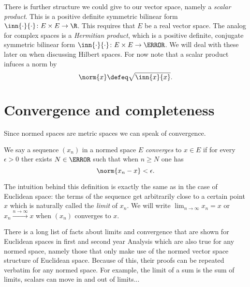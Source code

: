 \documentclass[12pt,oneside]{book}
\begin{document}
There is further structure we could give to our vector space, namely a \emph{scalar
product}. This is a positive definite symmetric bilinear form \( \inn{\cdot}{\cdot} \colon
E \times E \to \R \). This requires that \( E \) be a real vector space. The analog for
complex spaces is a \emph{Hermitian product}, which is a positive definite, conjugate
symmetric bilinear form \( \inn{\cdot}{\cdot} \colon E \times E \to \C \). We will deal
with these later on when discussing Hilbert spaces. For now note that a scalar product
infuces a norm by
\begin{equation*}
	\norm{x} \defeq \sqrt{\inn{x}{x}}.
\end{equation*}

\section{Convergence and completeness}
Since normed spaces are metric spaces we can speak of convergence. 
\begin{definition}[Convergence]
	We say a sequence \( (x_n) \) in a normed space \( E \) \emph{converges} to \( x \in E \) if
	for every \( \epsilon > 0 \) ther exists \( N \in \N \) such that when \( n \geq N \)
	one has
	\begin{equation*}
		\norm{x_n - x} < \epsilon.
	\end{equation*}
\end{definition}
The intuition behind this definition is exactly the same as in the case of Euclidean
space: the terms of the sequence get arbitrarily close to a certain point \( x \) which is
naturally called the \emph{limit} of \( x_n \). We will write \( \lim_{n \to \infty} x_n =
x\) or \( x_n \xrightarrow{n \to \infty} x \) when \( (x_n) \) converges to \( x \).

There is a long list of facts about limits and convergence that are shown for Euclidean
spaces in first and second year Analysis which are also true for any normed space, namely
those that only make use of the normed vector space structure of Euclidean space. Because
of this, their proofs can be repeated verbatim for any normed space. For example, the
limit of a sum is the sum of limits, scalars can move in and out of limits...
\end{document}

